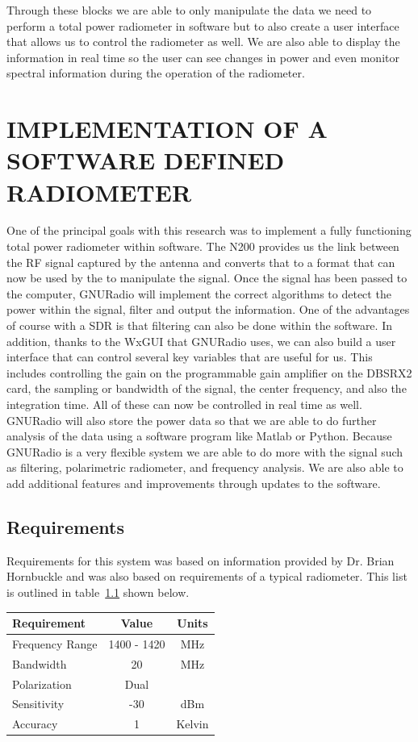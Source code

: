 Through these blocks we are able to only manipulate the data we need to perform a total power radiometer in software but to also create a user interface that allows us to control the radiometer as well.  We are also able to display the information in real time so the user can see changes in power and even monitor spectral information during the operation of the radiometer. 
\chapter{IMPLEMENTATION OF A SOFTWARE DEFINED RADIOMETER}
One of the principal goals with this research was to implement a fully functioning total power radiometer within software.  The N200 provides us the link between the RF signal captured by the antenna and converts that to a format that can now be used by the to manipulate the signal.  Once the signal has been passed to the computer, GNURadio will implement the correct algorithms to detect the power within the signal, filter and output the information.  One of the advantages of course with a SDR is that filtering can also be done within the software.  In addition, thanks to the WxGUI that GNURadio uses, we can also build a user interface that can control several key variables that are useful for us.  This includes controlling the gain on the programmable gain amplifier on the DBSRX2 card, the sampling or bandwidth of the signal, the center frequency, and also the integration time.  All of these can now be controlled in real time as well.  GNURadio will also store the power data so that we are able to do further analysis of the data using a software program like Matlab or Python.  Because GNURadio is a very flexible system we are able to do more with the signal such as filtering, polarimetric  radiometer, and frequency analysis.  We are also able to add additional features and improvements through updates to the software.

\section{Requirements}

Requirements for this system was based on information provided by Dr. Brian Hornbuckle and was also based on requirements of a typical radiometer.  This list is outlined in table~\ref{requirements} shown below.

\begin{table}[h!tb] \centering
{}
\label{requirements}
\begin{tabular}{lcc} \hline
\textbf{Requirement} & \textbf{Value} & \textbf{Units} \\ \hline
Frequency Range & 1400 - 1420 & MHz \\
Bandwidth & 20 & MHz \\
Polarization & Dual &  \\ 
Sensitivity & -30 & dBm \\
Accuracy & 1 & Kelvin \\ \hline
\end{tabular}
\end{table}

